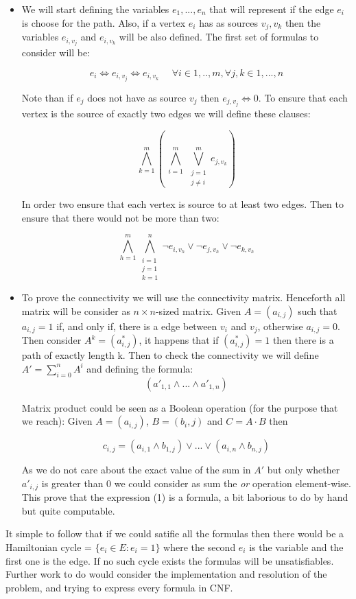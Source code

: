 \documentclass[11pt,a4paper]{article}
\theoremstyle{definition}
\begin{document}
\begin{itemize}
\item We will start defining the variables $e_1,...,e_n$ that will represent if the edge $e_i$ is choose for the path. Also, if a vertex $e_i$ has as sources $v_j,v_k$ then the variables $e_{i,v_j}$ and $e_{i,v_k}$ will be also defined. The first set of formulas to consider will be:

$$
	e_i \iff e_{i,v_j} \iff e_{i,v_k} \ \ \ \ \ \   \forall i \in 1,..,m, \forall j,k \in 1,...,n 
$$

Note than if $e_j$ does not have as source $v_j$ then $e_{j,v_j} \iff 0$. To ensure that each vertex is the source of exactly two edges we will define these clauses:

$$
	\bigwedge_{k=1}^m \left (\ \bigwedge_{i=1}^m \  \bigvee_{\substack{j=1\\  j\ne i}}^m e_{j,v_k} \right )
$$

In order two ensure that each vertex is source to at least two edges. Then to ensure that there would not be more than two:

$$
	\bigwedge_{h=1}^m \bigwedge_{\substack{i=1\\j=1\\k=1}}^n \neg e_{i,v_h} \vee \neg e_{j,v_h} \vee \neg e_{k,v_h} 
$$

\item To prove the connectivity we will use the connectivity matrix. Henceforth all matrix will be consider as $n\times n$-sized matrix. Given $A = (a_{i,j})$ such that $a_{i,j} = 1$ if, and only if, there is a edge between $v_i$ and $v_j$, otherwise $a_{i,j} = 0 $. Then consider $A^{k} = (a^*_{i,j})$, it happens that if $(a^*_{i,j})=1$ then there is a path of exactly length k. Then to check the connectivity we will define $A' = \sum_{i=0}^n A^i$ and defining the formula:\\
\[
(a'_{1,1}\wedge ... \wedge a'_{1,n}) \label{eq:einstein} \tag{1}
\]

Matrix product could be seen as a Boolean operation (for the purpose that we reach): Given $A = (a_{i,j})$, $B = (b_i,j)$ and $C=A\cdot B$ then 

$$
	c_{i,j} = (a_{i,1}\wedge b_{1,j}) \vee ... \vee (a_{i,n}\wedge b_{n,j})
$$

As we do not care about the exact value of the sum in $A'$ but only whether $a'_{i,j}$ is greater than 0 we could consider as sum the \emph{or} operation element-wise. This prove that the expression (1) is a formula, a bit laborious to do by hand but quite computable.

\end{itemize}
 It simple to follow that if we could satifie all the formulas then there would be a Hamiltonian cycle = $\{e_i\in E : e_i = 1\}$ where the second $e_i$ is the variable and the first one is the edge. If no such cycle exists the formulas will be unsatisfiables. Further work to do would consider the implementation and resolution of the problem, and trying to express every formula in CNF.
\end{document}
